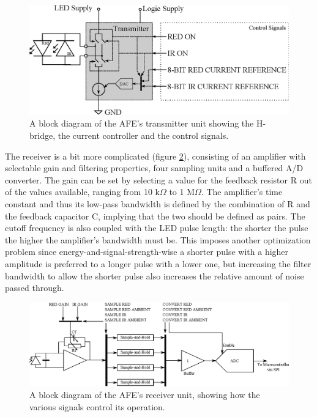 \begin{figure}[htcb]
\includegraphics[scale=0.75]{kuvat/transmitter_afe.eps}
\caption{A block diagram of the AFE's transmitter unit showing the H-bridge, the current controller and the control signals.}
\label{fig:transmitter_afe}
\end{figure}

The receiver is a bit more complicated (figure \ref{fig:receiver_afe}), consisting of an amplifier with selectable gain and filtering properties, four sampling units and a buffered A/D converter. The gain can be set by selecting a value for the feedback resistor R out of the values available, ranging from 10 k$\Omega$ to 1 M$\Omega$. The amplifier's time constant and thus its low-pass bandwidth is defined by the combination of R and the feedback capacitor C, implying that the two should be defined as pairs. The cutoff frequency is also coupled with the LED pulse length: the shorter the pulse the higher the amplifier's bandwidth must be. This imposes another optimization problem since energy-and-signal-strength-wise a shorter pulse with a higher amplitude is preferred to a longer pulse with a lower one, but increasing the filter bandwidth to allow the shorter pulse also increases the relative amount of noise passed through.

\begin{figure}[htcb]
\includegraphics[scale=0.8]{kuvat/receiver_afe.eps}
\caption{A block diagram of the AFE's receiver unit, showing how the various signals control its operation.}
\label{fig:receiver_afe}
\end{figure}

